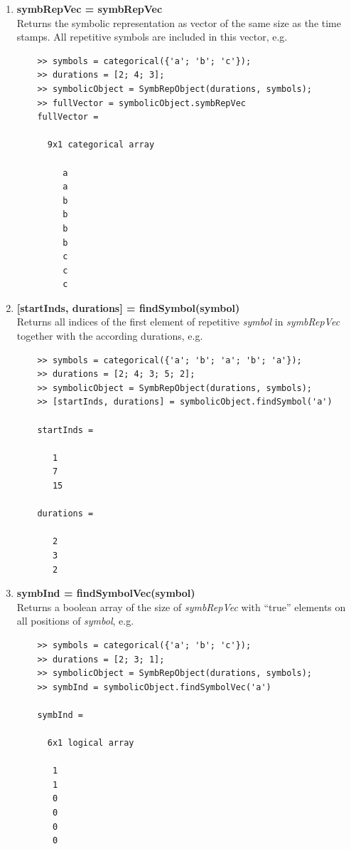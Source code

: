 \documentclass[a4]{scrreprt}
\begin{document}
\begin{enumerate}
	
	\item \textbf{symbRepVec = symbRepVec}\\
	Returns the symbolic representation as vector of the same size as the time stamps. All repetitive symbols are included in this vector, e.g.	
	\begin{verbatim}
	>> symbols = categorical({'a'; 'b'; 'c'});
	>> durations = [2; 4; 3];
	>> symbolicObject = SymbRepObject(durations, symbols);
	>> fullVector = symbolicObject.symbRepVec
	fullVector = 
	
	  9x1 categorical array
	
	     a 
	     a 
	     b 
	     b 
	     b 
	     b 
	     c 
	     c 
	     c 
	\end{verbatim}
	
	\item \textbf{[startInds, durations] = findSymbol(symbol)}\\
	Returns all indices of the first element of repetitive \textit{symbol} in \textit{symbRepVec} together with the according durations, e.g.
	\begin{verbatim}
	>> symbols = categorical({'a'; 'b'; 'a'; 'b'; 'a'});
	>> durations = [2; 4; 3; 5; 2];
	>> symbolicObject = SymbRepObject(durations, symbols);
	>> [startInds, durations] = symbolicObject.findSymbol('a')
	
	startInds =
	
	   1
	   7
	   15	
	
	durations =
	
	   2
	   3
	   2
	\end{verbatim}
	
	\item \textbf{symbInd = findSymbolVec(symbol)}\\
	Returns a boolean array of the size of \textit{symbRepVec} with ``true'' elements on all positions of \textit{symbol}, e.g.
	\begin{verbatim}
	>> symbols = categorical({'a'; 'b'; 'c'});
	>> durations = [2; 3; 1];
	>> symbolicObject = SymbRepObject(durations, symbols);
	>> symbInd = symbolicObject.findSymbolVec('a')
	
	symbInd =
	
	  6x1 logical array
	
	   1
	   1
	   0
	   0
	   0
	   0
	\end{verbatim}
	

\end{enumerate}
\end{document}
